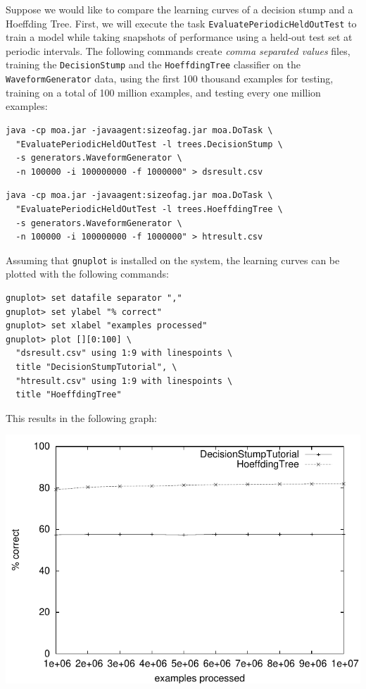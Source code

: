 \documentclass[a4paper,12pt,twoside]{book}
\begin{document}
Suppose we would like to compare the learning curves of a decision stump and a Hoeffding Tree.
First, we will execute the
 task \verb+EvaluatePeriodicHeldOutTest+ to train a model while taking snapshots of performance using a held-out test set at periodic intervals.
The following commands create {\em comma separated values} files, training the \verb+DecisionStump+ and the \verb+HoeffdingTree+ classifier on the \verb+WaveformGenerator+ data, using the first 100 thousand examples for testing, training on a total of 100 million examples, and testing every one million examples:

\begin{footnotesize}\begin{verbatim}
java -cp moa.jar -javaagent:sizeofag.jar moa.DoTask \
  "EvaluatePeriodicHeldOutTest -l trees.DecisionStump \
  -s generators.WaveformGenerator \
  -n 100000 -i 100000000 -f 1000000" > dsresult.csv
\end{verbatim}\end{footnotesize}

\begin{footnotesize}\begin{verbatim}
java -cp moa.jar -javaagent:sizeofag.jar moa.DoTask \
  "EvaluatePeriodicHeldOutTest -l trees.HoeffdingTree \
  -s generators.WaveformGenerator \
  -n 100000 -i 100000000 -f 1000000" > htresult.csv
\end{verbatim}\end{footnotesize}

Assuming that \verb+gnuplot+ is installed on the system, the learning curves can be plotted with the following commands:

\begin{footnotesize}\begin{verbatim}
gnuplot> set datafile separator ","
gnuplot> set ylabel "% correct"
gnuplot> set xlabel "examples processed"
gnuplot> plot [][0:100] \
  "dsresult.csv" using 1:9 with linespoints \
  title "DecisionStumpTutorial", \
  "htresult.csv" using 1:9 with linespoints \
  title "HoeffdingTree"
\end{verbatim}\end{footnotesize}

This results in the following graph:

\includegraphics{images/gnuplotGraph}
\end{document}
